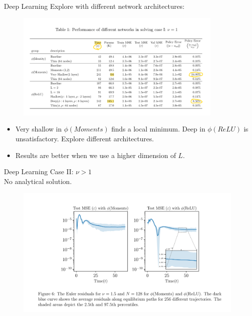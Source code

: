 \documentclass[dvipsnames,mathserif]{beamer}
\begin{document}
{\begin{frame}{Deep Learning}
Explore with different network architectures:
\begin{figure}[h!]
\centering
\includegraphics[width = 0.9\textwidth]{6.png}
\end{figure}
\begin{itemize}
    \item Very shallow in $\phi(Moments)$ finds a local minimum. Deep in $\phi(ReLU)$ is unsatisfactory. Explore different architectures.\\
    \item Results are better when we use a higher dimension of $L$.
\end{itemize}

\end{frame}

\begin{frame}{Deep Learning}
Case II: $\nu > 1$\\
No analytical solution.
\begin{figure}[h!]
\centering
\includegraphics[width = \textwidth]{7.png}
\end{figure}
\end{frame}

}
\end{document}
